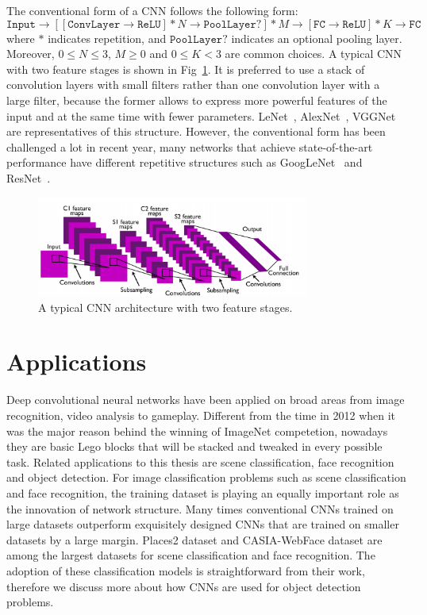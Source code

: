 The conventional form of a CNN follows the following form:
$$\mathtt{Input} \rightarrow [[\mathtt{ConvLayer} \rightarrow \mathtt{ReLU}] * N \rightarrow \mathtt{PoolLayer}?]*M \rightarrow [\mathtt{FC}\rightarrow \mathtt{ReLU}]*K \rightarrow \mathtt{FC}$$
where $*$ indicates repetition, and $\mathtt{PoolLayer}?$ indicates an optional pooling layer. Moreover, $0 \leq N \leq 3$, $M \geq 0$ and $0 \leq K < 3$ are common choices. A typical CNN with two feature stages is shown in Fig~\ref{fig:ch3-typicalcnn}. It is preferred to use a stack of convolution layers with small filters rather than one convolution layer with a large filter, because the former allows to express more powerful features of the input and at the same time with fewer parameters. LeNet~\cite{lecun1998gradient}, AlexNet~\cite{krizhevsky2012imagenet}, VGGNet~\cite{SimonyanZ14a} are representatives of this structure. However, the conventional form has been challenged a lot in recent year, many networks that achieve state-of-the-art performance have different repetitive structures such as GoogLeNet~\cite{szegedy2015going} and ResNet~\cite{kmhresnet15}.

\begin{figure}[!htbp]
    \centering
    \includegraphics[width=0.8\textwidth]{figure/ch3-typicalcnn.png}
    \caption{A typical CNN architecture with two feature stages.}
    \label{fig:ch3-typicalcnn}
\end{figure}

\section{Applications}

Deep convolutional neural networks have been applied on broad areas from image recognition, video analysis to gameplay. Different from the time in 2012 when it was the major reason behind the winning of ImageNet competetion, nowadays they are basic Lego blocks that will be stacked and tweaked in every possible task. Related applications to this thesis are scene classification, face recognition and object detection. For image classification problems such as scene classification and face recognition, the training dataset is playing an equally important role as the innovation of network structure. Many times conventional CNNs trained on large datasets outperform exquisitely designed CNNs that are trained on smaller datasets by a large margin. Places2 dataset and CASIA-WebFace dataset are among the largest datasets for scene classification and face recognition. The adoption of these classification models is straightforward from their work, therefore we discuss more about how CNNs are used for object detection problems.

